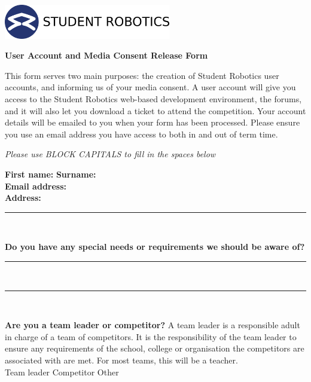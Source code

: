 \documentclass[a4paper,10pt]{article}
\newcommand{\checkbox}[1]{#1\hspace{0.2cm}\raisebox{-0.3mm}{$\square$}}
\newcommand{\textfield}[1]{\textbf{#1:} \hrulefill\hspace{0mm}}
\newcommand{\fieldsep}{\\[2.5mm]}
\newcommand{\textfieldline}{{\hrule\hspace{2mm}\fieldsep}}
\begin{document}
\pagestyle{empty}

\begin{minipage}[c]{0.38\textwidth}
\includegraphics[height=1.5cm]{logo}
\end{minipage}
\hspace{0.12\textwidth}
\begin{minipage}[c]{0.48\textwidth}
\begin{center}
{\LARGE \textbf{User Account and Media Consent Release Form} \par}
\end{center}
\end{minipage}
\vspace{1cm}

This form serves two main purposes: the creation of Student Robotics user accounts, and informing us of your media consent.
A user account will give you access to the Student Robotics web-based development environment, the forums, and it will also let you download a ticket to attend the competition.
Your account details will be emailed to you when your form has been processed.
Please ensure you use an email address you have access to both in and out of term time.

\begin{center}
\textit{Please use BLOCK CAPITALS to fill in the spaces below}
\end{center}

\textfield{First name}  \textfield{Surname} \fieldsep
\textfield{Email address} \fieldsep
\textfield{Address} \fieldsep
\textfieldline

\textbf{Do you have any special needs or requirements we should be aware of?}
\fieldsep \textfieldline \textfieldline

\textbf{Are you a team leader or competitor?}
A team leader is a responsible adult in charge of a team of competitors.
It is the responsibility of the team leader to ensure any requirements of the school, college or organisation the competitors are associated with are met.
For most teams, this will be a teacher.\\[2mm]
\checkbox{Team leader} \hspace{1.5cm} \checkbox{Competitor} \hspace{1.5cm} \checkbox{Other} \\
\end{document}
